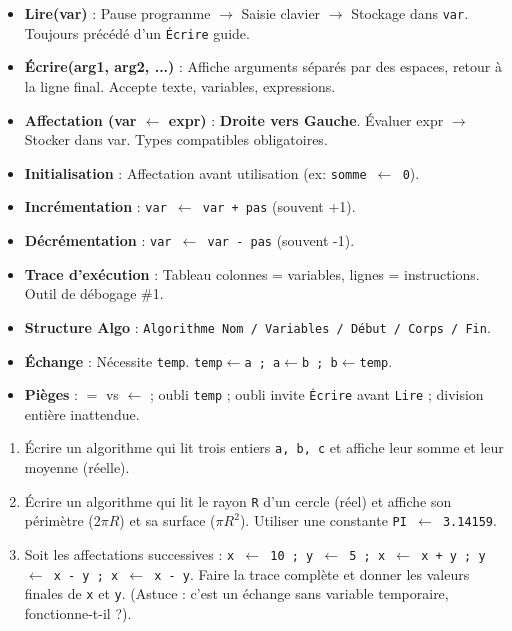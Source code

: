 \documentclass[11pt]{article}
\begin{document}
\begin{aretenir}
\begin{itemize}
    \item \textbf{Lire(var)} : Pause programme $\to$ Saisie clavier $\to$ Stockage dans \texttt{var}. Toujours précédé d'un \texttt{Écrire} guide.
    \item \textbf{Écrire(arg1, arg2, ...)} : Affiche arguments séparés par des espaces, retour à la ligne final. Accepte texte, variables, expressions.
    \item \textbf{Affectation (var $\leftarrow$ expr)} : \textbf{Droite vers Gauche}. Évaluer expr $\to$ Stocker dans var. Types compatibles obligatoires.
    \item \textbf{Initialisation} : Affectation avant utilisation (ex: \texttt{somme $\leftarrow$ 0}).
    \item \textbf{Incrémentation} : \texttt{var $\leftarrow$ var + pas} (souvent +1).
    \item \textbf{Décrémentation} : \texttt{var $\leftarrow$ var - pas} (souvent -1).
    \item \textbf{Trace d'exécution} : Tableau colonnes = variables, lignes = instructions. Outil de débogage \#1.
    \item \textbf{Structure Algo} : \texttt{Algorithme Nom / Variables / Début / Corps / Fin}.
    \item \textbf{Échange} : Nécessite \texttt{temp}. \texttt{temp$\leftarrow$a ; a$\leftarrow$b ; b$\leftarrow$temp}.
    \item \textbf{Pièges} : $=$ vs $\leftarrow$ ; oubli \texttt{temp} ; oubli invite \texttt{Écrire} avant \texttt{Lire} ; division entière inattendue.
\end{itemize}
\end{aretenir}

\begin{exercice}
\begin{enumerate}
    \item Écrire un algorithme qui lit trois entiers \texttt{a, b, c} et affiche leur somme et leur moyenne (réelle).
    \item Écrire un algorithme qui lit le rayon \texttt{R} d'un cercle (réel) et affiche son périmètre ($2\pi R$) et sa surface ($\pi R^2$). Utiliser une constante \texttt{PI $\leftarrow$ 3.14159}.
    \item Soit les affectations successives : \texttt{x $\leftarrow$ 10 ; y $\leftarrow$ 5 ; x $\leftarrow$ x + y ; y $\leftarrow$ x - y ; x $\leftarrow$ x - y}. Faire la trace complète et donner les valeurs finales de \texttt{x} et \texttt{y}. (Astuce : c'est un échange sans variable temporaire, fonctionne-t-il ?).
\end{enumerate}
\end{exercice}
\end{document}
